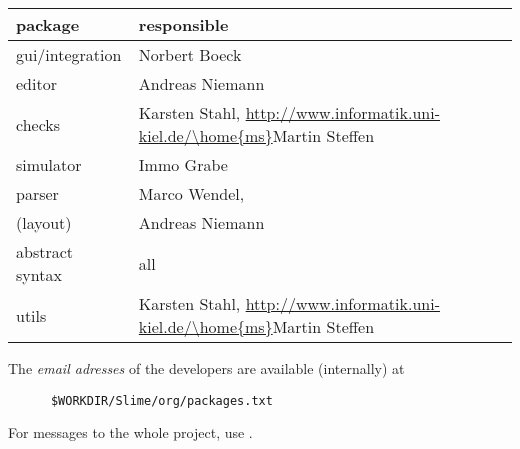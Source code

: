 \documentclass[11pt,german]{article}
\begin{document}
\begin{table}[htbp]
  \centering
  \begin{tabular}[t]{l@{\quad\quad}l}
     package  &  responsible
     \\\hline
     gui/integration & Norbert Boeck
     \\
     editor & Andreas Niemann
     \\
     checks & 
     Karsten Stahl,
     \url{http://www.informatik.uni-kiel.de/\home{ms}}{Martin Steffen}
     \\
     simulator & Immo Grabe
     \\
     parser & Marco Wendel,
     \\
     (layout) & Andreas Niemann
     \\
     abstract syntax & all
     \\
     utils 
     &
     Karsten Stahl,
     \url{http://www.informatik.uni-kiel.de/\home{ms}}{Martin Steffen}
  \end{tabular}
  \caption{}
  \label{tab:gruppen}
\end{table}




The \emph{email adresses} of the developers are available (internally) at
\begin{verbatim}
      $WORKDIR/Slime/org/packages.txt
\end{verbatim}
For messages to the whole project, use
.

















\end{document}
